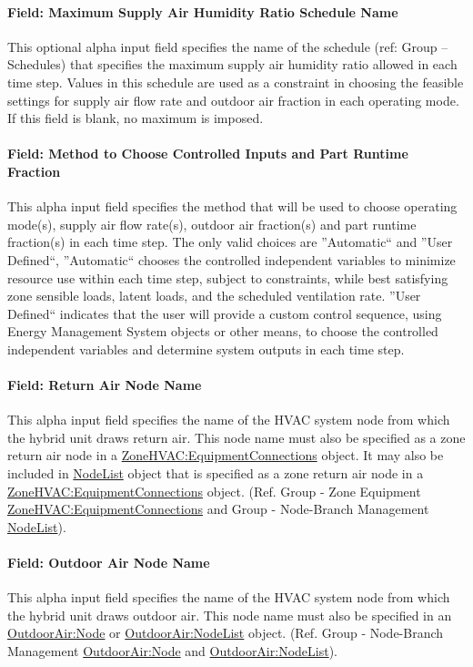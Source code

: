 \paragraph{Field: Maximum Supply Air Humidity Ratio Schedule Name}
This optional alpha input field specifies the name of the schedule (ref: Group – Schedules) that specifies the maximum supply air humidity ratio allowed in each time step. Values in this schedule are used as a constraint in choosing the feasible settings for supply air flow rate and outdoor air fraction in each operating mode. If this field is blank, no maximum is imposed.

\paragraph{Field: Method to Choose Controlled Inputs and Part Runtime Fraction}
This alpha input field specifies the method that will be used to choose operating mode(s), supply air flow rate(s), outdoor air fraction(s) and part runtime fraction(s) in each time step. The only valid choices are ''Automatic`` and ''User Defined``, ''Automatic`` chooses the controlled independent variables to minimize resource use within each time step, subject to constraints, while best satisfying zone sensible loads, latent loads, and the scheduled ventilation rate. ''User Defined`` indicates that the user will provide a custom control sequence, using Energy Management System objects or other means, to choose the controlled independent variables and determine system outputs in each time step.

\paragraph{Field: Return Air Node Name}
This alpha input field specifies the name of the HVAC system node from which the hybrid unit draws return air. This node name must also be specified as a zone return air node in a \hyperref[zonehvacequipmentconnections]{ZoneHVAC:EquipmentConnections} object. It may also be included in \hyperref[nodelist]{NodeList} object that is specified as a zone return air node in a \hyperref[zonehvacequipmentconnections]{ZoneHVAC:EquipmentConnections} object. (Ref. Group - Zone Equipment \hyperref[zonehvacequipmentconnections]{ZoneHVAC:EquipmentConnections} and Group - Node-Branch Management \hyperref[nodelist]{NodeList}).

\paragraph{Field: Outdoor Air Node Name}
This alpha input field specifies the name of the HVAC system node from which the hybrid unit draws outdoor air. This node name must also be specified in an \hyperref[outdoorairnode]{OutdoorAir:Node} or \hyperref[outdoorairnodelist]{OutdoorAir:NodeList} object. (Ref. Group - Node-Branch Management \hyperref[outdoorairnode]{OutdoorAir:Node} and \hyperref[outdoorairnodelist]{OutdoorAir:NodeList}).

